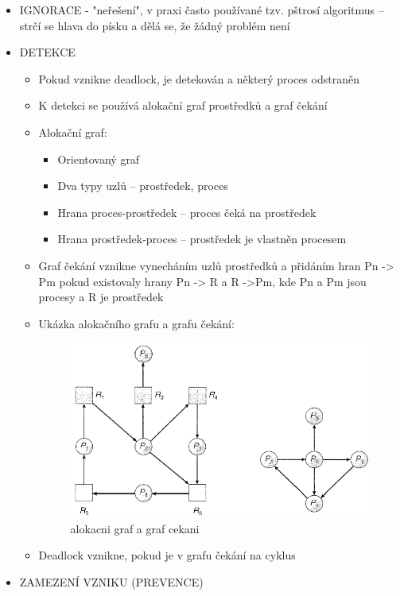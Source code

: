 \documentclass[10pt,a4paper]{article}
\begin{document}
\begin{itemize}
	\item IGNORACE - "neřešení", v praxi často používané tzv. pštrosí algoritmus – strčí se hlava do písku a dělá se, že žádný problém není
	\item DETEKCE
	\begin{itemize}
		\item Pokud vznikne deadlock, je detekován a některý proces odstraněn
		\item K detekci se používá alokační graf prostředků a graf čekání
		\item Alokační graf:
		\begin{itemize}
			\item Orientovaný graf
			\item Dva typy uzlů – prostředek, proces
			\item Hrana proces-prostředek – proces čeká na prostředek
			\item Hrana prostředek-proces – prostředek je vlastněn procesem
		\end{itemize}
		\item Graf čekání vznikne vynecháním uzlů prostředků a přidáním hran Pn -> Pm pokud existovaly hrany Pn -> R a R ->Pm, kde Pn a Pm jsou procesy a R je prostředek
		\item Ukázka alokačního grafu a grafu čekání:
		\begin{figure} [h]
			\includegraphics[scale=0.8]{img/alokacni_graf_a_graf_cekani.png}
			\caption{alokacni graf a graf cekani}	
		\end{figure}
		\item Deadlock vznikne, pokud je v grafu čekání na cyklus
	\end{itemize}
	\item ZAMEZENÍ VZNIKU (PREVENCE)
	\begin{itemize}

\end{itemize}
\end{itemize}
\end{document}
